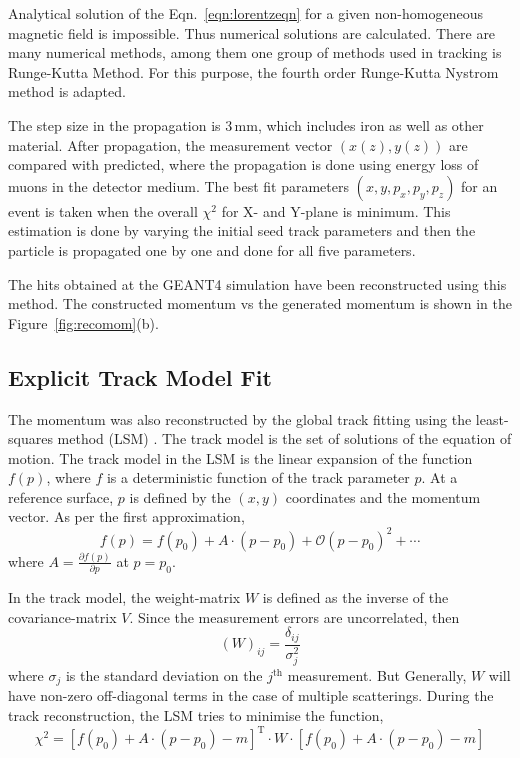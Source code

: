 Analytical solution of the Eqn.~\ref{eqn:lorentzeqn} for a given
non-homogeneous magnetic field is impossible. Thus numerical solutions
are calculated. There are many numerical methods, among them one group
of methods used in tracking is Runge-Kutta Method. For this purpose,
the fourth order Runge-Kutta Nystrom \cite{lund2009track} method is
adapted.

The step size in the propagation is 3\,mm, which includes iron as well
as other material. After propagation, the measurement vector
$(x(z),y(z))$ are compared with predicted, where the propagation is done
using energy loss of muons in the detector medium. The best fit parameters
$(x,y,p_{x},p_{y},p_{z})$ for an event is taken when the overall
$\chi^{2}$ for X- and Y-plane is minimum. This estimation is done by
varying the initial seed track parameters and then the particle is
propagated one by one and done for all five parameters.    

The hits obtained at the GEANT4 simulation have been reconstructed
using this method. The constructed momentum vs the generated momentum
is shown in the Figure~\ref{fig:recomom}(b).

\subsection{Explicit Track Model Fit}
The momentum was also reconstructed by the global track fitting using
the least-squares method (LSM) \cite{explicit1}. The track model is
the set of solutions of the equation of motion. The track model in the
LSM is the linear expansion of the function $f\left(p\right)$, where
$f$ is a deterministic function of the track parameter $p$. At a
reference surface, $p$ is defined by the $\left(x,y\right)$
coordinates and the momentum vector. As per the first approximation,
\begin{equation}
  f\left(p\right) = f\left(p_{0}\right) + A\cdot \left(p-p_{0}\right) + \mathcal{O} \left(p-p_{0}\right)^{2}+\cdots
\end{equation}
where $A=\frac{\partial f\left(p\right)}{\partial p}$ at $p=p_{0}$.

In the track model, the weight-matrix $W$ is defined as the inverse of
the covariance-matrix $V$. Since the measurement errors are
uncorrelated, then
\begin{equation}
  \left(W\right)_{ij} = \frac{\delta_{ij}}{\sigma_{j}^{2}}
\end{equation}
where $\sigma_{j}$ is the standard deviation on the $j^{\text{th}}$
measurement. But Generally, $W$ will have non-zero off-diagonal terms
in the case of multiple scatterings. During the track reconstruction,
the LSM tries to minimise the function,
\begin{equation}
  \chi^{2} = \left[f\left(p_{0}\right)+ A\cdot \left(p-p_{0}\right) - m\right]^{\mathrm{T}} \cdot W \cdot \left[f\left(p_{0}\right)+ A\cdot \left(p-p_{0}\right) - m\right]
\end{equation}


